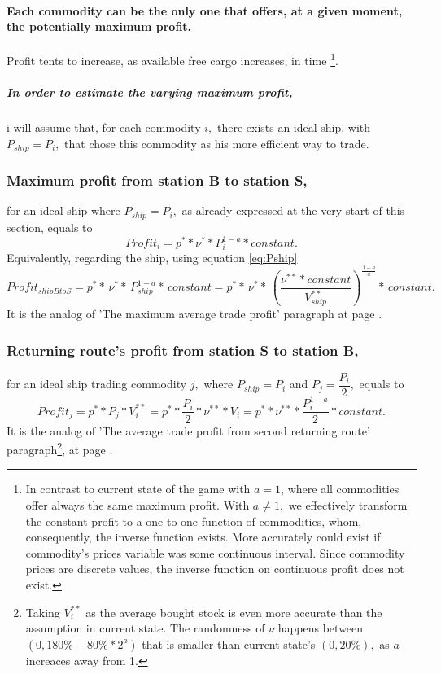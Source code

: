 \documentclass[]{article}
\begin{document}
\paragraph{Each commodity can be the only one that offers, at a given moment, the potentially maximum profit.} Profit tents to increase, as available free cargo increases, in time \footnote{In contrast to current state of the game with $a=1$, where all commodities offer always the same maximum profit. With $a\neq1,$ we effectively transform the constant profit to a one to one function of commodities, whom, consequently, the inverse function exists. More accurately could exist if commodity's prices variable was some continuous interval. Since commodity prices are discrete values, the inverse function on continuous profit does not exist.}.
 \subparagraph*{In order to estimate the varying maximum profit,} i will assume that, for each commodity $i,$ there exists an ideal ship, with $P_{ship}=P_{i},$ that chose this commodity as his more efficient way to trade.
 \subsubsection{Maximum profit from station B to station S,} for an ideal ship where $P_{ship}=P_{i},$ as already expressed at the very start of this section, equals to
 \[Profit_{i}=p^{*}*\nu^{*}*P^{1-a}_{i}*constant.\]
 Equivalently, regarding the ship, using equation \eqref{eq:Pship}
  \[Profit_{shipBtoS}=p^{*}*\,\nu^{*}*\,P^{1-a}_{ship}*\,constant=p^{*}*\,\nu^{*}*\,\left( \dfrac{\nu^{**}*constant}{V^{**}_{ship}}\right)^{\frac{1-a}{a}}*\, constant.\]
  	It is the analog of 'The maximum average trade profit' paragraph at page \pageref{maximumCurrentTradingProfit}.
\subsubsection{Returning route's profit from station S to station B,} for an ideal ship trading commodity $j,$ where $P_{ship}=P_{i}$ and $P_{j}=\dfrac{P_{i}}{2},$ equals to
 \[Profit_{j}=p^{*}*P_{j}*V^{**}_{i}=p^{*}*\dfrac{P_{i}}{2}*\nu^{**}*V_{i}=p^{*}*\nu^{**}*\dfrac{P^{1-a}_{i}}{2}*constant.\]
 It is the analog of 'The average trade profit from second returning route' paragraph\footnote{Taking $V^{**}_{i}$ as the average bought stock is even more accurate than the assumption in current state. The randomness of $\nu$ happens between $(0,180\%-80\%*2^a)$ that is smaller than current state's $(0,20\%),$  as $a$ increaces away from 1.}, at page \pageref{eq:trade_profit}.
 
\end{document}
